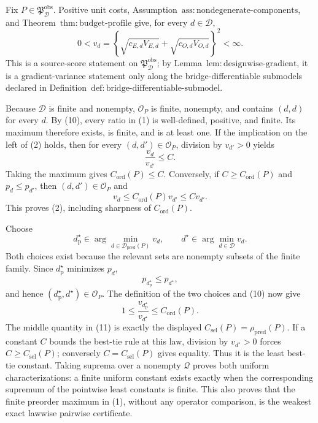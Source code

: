 Fix \(P\in\mathfrak P_{\mathcal D}^{\mathrm{obs}}\).  Positive unit costs, Assumption~\(\mathrm{ass{:}nondegenerate\text{-}components}\), and Theorem~\(\mathrm{thm{:}budget\text{-}profile}\) give, for every \(d\in\mathcal D\),
\[
 0<v_d
 =\left\{\sqrt{c_{E,d}V_{E,d}}+\sqrt{c_{O,d}V_{O,d}}\right\}^{2}
 <\infty.                                                     \tag{10}
\]
This is a source-score statement on \(\mathfrak P_{\mathcal D}^{\mathrm{obs}}\); by Lemma~\(\mathrm{lem{:}designwise\text{-}gradient}\), it is a gradient-variance statement only along the bridge-differentiable submodels declared in Definition~\(\mathrm{def{:}bridge\text{-}differentiable\text{-}submodel}\).

Because \(\mathcal D\) is finite and nonempty, \(\mathcal O_P\) is finite, nonempty, and contains \((d,d)\) for every \(d\).  By (10), every ratio in (1) is well-defined, positive, and finite.  Its maximum therefore exists, is finite, and is at least one.  If the implication on the left of (2) holds, then for every \((d,d')\in\mathcal O_P\), division by \(v_{d'}>0\) yields
\[
 \frac{v_d}{v_{d'}}\le C.
\]
Taking the maximum gives \(C_{\mathrm{ord}}(P)\le C\).  Conversely, if \(C\ge C_{\mathrm{ord}}(P)\) and \(p_d\le p_{d'}\), then \((d,d')\in\mathcal O_P\) and
\[
 v_d\le C_{\mathrm{ord}}(P)v_{d'}\le Cv_{d'}.
\]
This proves (2), including sharpness of \(C_{\mathrm{ord}}(P)\).

Choose
\[
 d_{\mathrm p}^{\star}\in
 \arg\min_{d\in\mathcal D_{\mathrm{pred}}(P)}v_d,
 \qquad
 d^{\star}\in\arg\min_{d\in\mathcal D}v_d.
\]
Both choices exist because the relevant sets are nonempty subsets of the finite family.  Since \(d_{\mathrm p}^{\star}\) minimizes \(p_d\),
\[
 p_{d_{\mathrm p}^{\star}}\le p_{d^{\star}},
\]
and hence \((d_{\mathrm p}^{\star},d^{\star})\in\mathcal O_P\).  The definition of the two choices and (10) now give
\[
 1
 \le \frac{v_{d_{\mathrm p}^{\star}}}{v_{d^{\star}}}
 \le C_{\mathrm{ord}}(P).                                   \tag{11}
\]
The middle quantity in (11) is exactly the displayed \(C_{\mathrm{sel}}(P)=\rho_{\mathrm{pred}}(P)\).  If a constant \(C\) bounds the best-tie rule at this law, division by \(v_{d^{\star}}>0\) forces \(C\ge C_{\mathrm{sel}}(P)\); conversely \(C=C_{\mathrm{sel}}(P)\) gives equality.  Thus it is the least best-tie constant.  Taking suprema over a nonempty \(\mathcal Q\) proves both uniform characterizations: a finite uniform constant exists exactly when the corresponding supremum of the pointwise least constants is finite.  This also proves that the finite preorder maximum in (1), without any operator comparison, is the weakest exact lawwise pairwise certificate.

